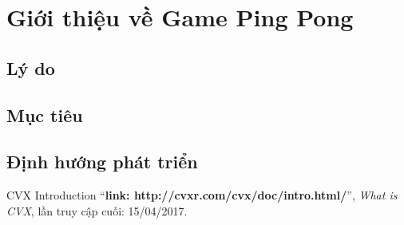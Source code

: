 \documentclass[a4paper]{article}
\begin{document}
\newpage
\section{Giới thiệu về Game Ping Pong}
\subsection{Lý do}
\subsection{Mục tiêu}
\subsection{Định hướng phát triển}


\newpage





\begin{thebibliography}{80}

CVX Introduction
``\textbf{link: http://cvxr.com/cvx/doc/intro.html/}'',
\textit{What is CVX}, lần truy cập cuối: 15/04/2017.

\end{thebibliography}
\end{document}
